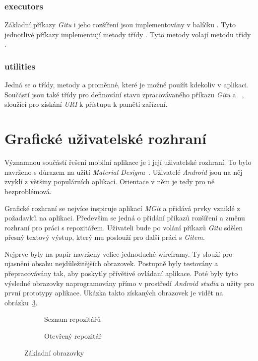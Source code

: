     \subsubsection{executors}
    Základní příkazy \emph{Gitu} i jeho rozšíření jsou implementovány v balíčku . Tyto jednotlivé příkazy implementují metody třídy . Tyto metody volají metodu  třídy .

    \subsubsection{utilities}
    Jedná se o třídy, metody a proměnné, které je možné použít kdekoliv v aplikaci. Součástí jsou také třídy  pro definování stavu zpracovávaného příkazu \emph{Gitu} a ~, sloužící pro získání \emph{URI} k přístupu k paměti zařízení.

\newpage
\section{Grafické uživatelské rozhraní}
Významnou součástí řešení mobilní aplikace je i její uživatelské rozhraní. To bylo navrženo s důrazem na užití \emph{Material Designu}~. Uživatelé \emph{Android} jsou na něj zvyklí z většiny populárních aplikací. Orientace v něm je tedy pro ně bezproblémová.

Grafické rozhraní se nejvíce inspiruje aplikací \emph{MGit} a přidává prvky vzniklé z požadavků na aplikaci. Především se jedná o přidání příkazů rozšíření a změnu rozhraní pro práci s repozitářem. Uživateli bude po volání příkazů \emph{Gitu} sdělen přesný textový výstup, který mu poslouží pro další práci s \emph{Gitem}. 

Nejprve byly na papír navrženy velice jednoduché wireframy. Ty slouží pro ujasnění obsahu nejdůležitějších obrazovek. Postupně byly testovány a přepracovávány tak, aby poskytly přívětivé ovládaní aplikace. Poté byly tyto výsledné obrazovky naprogramovány přímo v prostředí \emph{Android studia} a užity pro první prototypy aplikace. Ukázka takto získaných obrazovek je vidět na obrázku~\ref{fig:obrazovky}.

\begin{figure}[ht]
    \vspace{0.5cm}
    \centering
    \begin{subfigure}{.4\textwidth}        
        \centering
        \caption{Seznam repozitářů}\label{fig:orig}
        \label{fig:repolist_frame}
    \end{subfigure}
    \begin{subfigure}{.4\textwidth}
        \centering
        \caption{Otevřený repozitář}
        \label{fig:result_frame}
    \end{subfigure}
\caption{Základní obrazovky}%
\label{fig:obrazovky}%
\end{figure}

